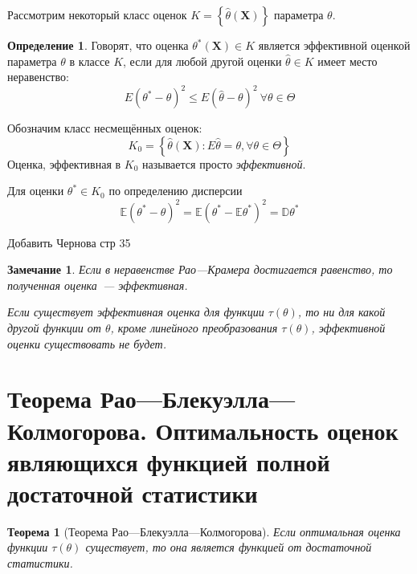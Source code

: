 \documentclass[oneside,final,14pt]{extreport}
\newtheorem{thm}{Теорема}[section]
\newtheorem*{rmrk}{Замечание}
\theoremstyle{definition}
\newtheorem{defn}{Определение}[section]
\begin{document}
Рассмотрим некоторый класс оценок $K=\left\{\hat{\theta}\left(\mathbf{X}\right)\right\}$ параметра $\theta$.
\begin{defn}
    Говорят, что оценка $\theta^{*}\left(\mathbf{X}\right) \in K$ является эффективной оценкой параметра $\theta$ в классе $K$, если для любой другой оценки $\hat{\theta} \in K$ имеет место неравенство:
    \begin{equation*}
        E\left(\theta^{*}-\theta\right)^{2} \leqslant E(\hat{\theta}-\theta)^{2}~ \forall \theta \in \Theta
    \end{equation*}
\end{defn}
Обозначим класс несмещённых оценок:
\begin{equation*}
    K_{0}=\left\{\hat{\theta}\left(\mathbf{X}\right): E \hat{\theta}=\theta, \forall \theta \in \Theta\right\}
\end{equation*}
Оценка, эффективная в $K_0$ называется просто {\it эффективной}.

Для оценки $\theta^{*} \in K_{0}$ по определению дисперсии
\begin{equation*}
    \mathbb{E}\left(\theta^{*}-\theta\right)^{2}=\mathbb{E}\left(\theta^{*}-\mathbb{E} \theta^{*}\right)^{2}=\mathbb{D} \theta^{*}
\end{equation*}

Добавить Чернова стр 35

\begin{rmrk}
Если в неравенстве Рао---Крамера достигается равенство, то полученная оценка~--- эффективная.

Если существует эффективная оценка для функции $\tau(\theta)$, то ни для какой другой функции от $\theta$, кроме линейного преобразования $\tau(\theta)$, эффективной оценки существовать не будет. 
\end{rmrk}

\section{Теорема Рао—Блекуэлла—Колмогорова. Оптимальность оценок являющихся функцией полной достаточной статистики}

\begin{thm}[Теорема Рао—Блекуэлла—Колмогорова] Если оптимальная оценка функции $\tau(\theta)$ существует, то она является функцией от достаточной статистики.
\end{thm}
\end{document}
